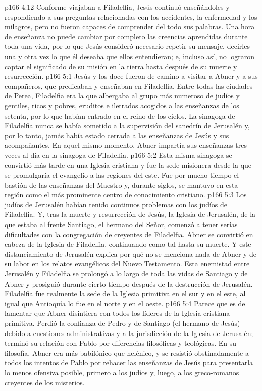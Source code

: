 \vs p166 4:12 \pc Conforme viajaban a Filadelfia, Jesús continuó enseñándoles y respondiendo a sus preguntas relacionadas con los accidentes, la enfermedad y los milagros, pero no fueron capaces de comprender del todo sus palabras. Una hora de enseñanza no puede cambiar por completo las creencias aprendidas durante toda una vida, por lo que Jesús consideró necesario repetir su mensaje, decirles una y otra vez lo que él deseaba que ellos entendieran; e, incluso así, no lograron captar el significado de su misión en la tierra hasta después de su muerte y resurrección.
\vs p166 5:1 Jesús y los doce fueron de camino a visitar a Abner y a sus compañeros, que predicaban y enseñaban en Filadelfia. Entre todas las ciudades de Perea, Filadelfia era la que albergaba al grupo más numeroso de judíos y gentiles, ricos y pobres, eruditos e iletrados acogidos a las enseñanzas de los setenta, por lo que habían entrado en el reino de los cielos. La sinagoga de Filadelfia nunca se había sometido a la supervisión del sanedrín de Jerusalén y, por lo tanto, jamás había estado cerrada a las enseñanzas de Jesús y sus acompañantes. En aquel mismo momento, Abner impartía sus enseñanzas tres veces al día en la sinagoga de Filadelfia.
\vs p166 5:2 Esta misma sinagoga se convirtió más tarde en una Iglesia cristiana y fue la sede misionera desde la que se promulgaría el evangelio a las regiones del este. Fue por mucho tiempo el bastión de las enseñanzas del Maestro y, durante siglos, se mantuvo en esta región como el más prominente centro de conocimiento cristiano.
\vs p166 5:3 Los judíos de Jerusalén habían tenido continuos problemas con los judíos de Filadelfia. Y, tras la muerte y resurrección de Jesús, la Iglesia de Jerusalén, de la que estaba al frente Santiago, el hermano del Señor, comenzó a tener serias dificultades con la congregación de creyentes de Filadelfia. Abner se convirtió en cabeza de la Iglesia de Filadelfia, continuando como tal hasta su muerte. Y este distanciamiento de Jerusalén explica por qué no se menciona nada de Abner y de su labor en los relatos evangélicos del Nuevo Testamento. Esta enemistad entre Jerusalén y Filadelfia se prolongó a lo largo de toda las vidas de Santiago y de Abner y prosiguió durante cierto tiempo después de la destrucción de Jerusalén. Filadelfia fue realmente la sede de la Iglesia primitiva en el sur y en el este, al igual que Antioquía lo fue en el norte y en el oeste.
\vs p166 5:4 \pc Parece que es de lamentar que Abner disintiera con todos los líderes de la Iglesia cristiana primitiva. Perdió la confianza de Pedro y de Santiago (el hermano de Jesús) debido a cuestiones administrativas y a la jurisdicción de la Iglesia de Jerusalén; terminó su relación con Pablo por diferencias filosóficas y teológicas. En su filosofía, Abner era más babilónico que helénico, y se resistió obstinadamente a todos los intentos de Pablo por rehacer las enseñanzas de Jesús para presentarla lo menos ofensiva posible, primero a los judíos y, luego, a los greco\hyp{}romanos creyentes de los misterios.
